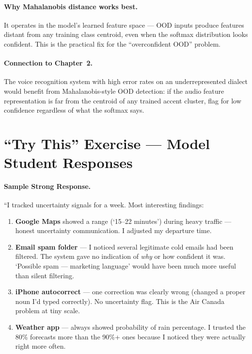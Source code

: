 \paragraph{Why Mahalanobis distance works best.} It operates in the model's learned feature space --- OOD inputs produce features distant from any training class centroid, even when the softmax distribution looks confident. This is the practical fix for the ``overconfident OOD'' problem.

\paragraph{Connection to Chapter~2.} The voice recognition system with high error rates on an underrepresented dialect would benefit from Mahalanobis-style OOD detection: if the audio feature representation is far from the centroid of any trained accent cluster, flag for low confidence regardless of what the softmax says.

\section{``Try This'' Exercise --- Model Student Responses}

\paragraph{Sample Strong Response.}

``I tracked uncertainty signals for a week. Most interesting findings:

\begin{enumerate}
    \item \textbf{Google Maps} showed a range (`15--22 minutes') during heavy traffic --- honest uncertainty communication. I adjusted my departure time.

    \item \textbf{Email spam folder} --- I noticed several legitimate cold emails had been filtered. The system gave no indication of \emph{why} or how confident it was. `Possible spam --- marketing language' would have been much more useful than silent filtering.

    \item \textbf{iPhone autocorrect} --- one correction was clearly wrong (changed a proper noun I'd typed correctly). No uncertainty flag. This is the Air Canada problem at tiny scale.

    \item \textbf{Weather app} --- always showed probability of rain percentage. I trusted the 80\% forecasts more than the 90\%+ ones because I noticed they were actually right more often.
\end{enumerate}

